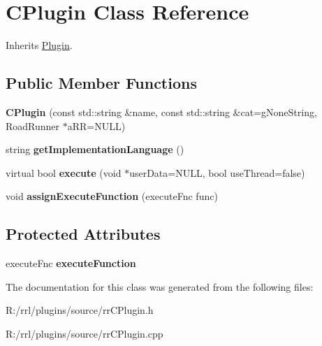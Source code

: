\hypertarget{classrrp_1_1_c_plugin}{\section{C\-Plugin Class Reference}
\label{classrrp_1_1_c_plugin}
}


Inherits \hyperlink{classrrp_1_1_plugin}{Plugin}.

\subsection*{Public Member Functions}
\begin{DoxyCompactItemize}
\item 
\hypertarget{classrrp_1_1_c_plugin_a88c0b77afd6b2b55d95076e267f63003}{{\bfseries C\-Plugin} (const std\-::string \&name, const std\-::string \&cat=g\-None\-String, Road\-Runner $\ast$a\-R\-R=N\-U\-L\-L)}\label{classrrp_1_1_c_plugin_a88c0b77afd6b2b55d95076e267f63003}

\item 
\hypertarget{classrrp_1_1_c_plugin_aa20ce1f3b2f2ed0ae69863a5ec562411}{string {\bfseries get\-Implementation\-Language} ()}\label{classrrp_1_1_c_plugin_aa20ce1f3b2f2ed0ae69863a5ec562411}

\item 
\hypertarget{classrrp_1_1_c_plugin_ab9739fdbcd2f8abb05fbd199828b7e84}{virtual bool {\bfseries execute} (void $\ast$user\-Data=N\-U\-L\-L, bool use\-Thread=false)}\label{classrrp_1_1_c_plugin_ab9739fdbcd2f8abb05fbd199828b7e84}

\item 
\hypertarget{classrrp_1_1_c_plugin_a3465174deb0abcfca9db723220698f6f}{void {\bfseries assign\-Execute\-Function} (execute\-Fnc func)}\label{classrrp_1_1_c_plugin_a3465174deb0abcfca9db723220698f6f}

\end{DoxyCompactItemize}
\subsection*{Protected Attributes}
\begin{DoxyCompactItemize}
\item 
\hypertarget{classrrp_1_1_c_plugin_ad5aa353f70438761be60679f657ae5ae}{execute\-Fnc {\bfseries execute\-Function}}\label{classrrp_1_1_c_plugin_ad5aa353f70438761be60679f657ae5ae}

\end{DoxyCompactItemize}


The documentation for this class was generated from the following files\-:\begin{DoxyCompactItemize}
\item 
R\-:/rrl/plugins/source/rr\-C\-Plugin.\-h\item 
R\-:/rrl/plugins/source/rr\-C\-Plugin.\-cpp\end{DoxyCompactItemize}
